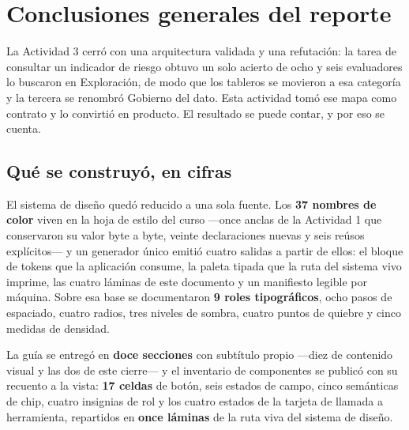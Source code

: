 %
%

\section{Conclusiones generales del reporte}

La Actividad 3 cerró con una arquitectura validada y una refutación: la tarea de consultar un indicador de riesgo obtuvo un solo acierto de ocho y seis evaluadores lo buscaron en Exploración, de modo que los tableros se movieron a esa categoría y la tercera se renombró Gobierno del dato. Esta actividad tomó ese mapa como contrato y lo convirtió en producto. El resultado se puede contar, y por eso se cuenta.

\subsection{Qué se construyó, en cifras}

El sistema de diseño quedó reducido a una sola fuente. Los \textbf{37 nombres de color} viven en la hoja de estilo del curso ---once anclas de la Actividad 1 que conservaron su valor byte a byte, veinte declaraciones nuevas y seis reúsos explícitos--- y un generador único emitió cuatro salidas a partir de ellos: el bloque de tokens que la aplicación consume, la paleta tipada que la ruta del sistema vivo imprime, las cuatro láminas de este documento y un manifiesto legible por máquina. Sobre esa base se documentaron \textbf{9 roles tipográficos}, ocho pasos de espaciado, cuatro radios, tres niveles de sombra, cuatro puntos de quiebre y cinco medidas de densidad.

La guía se entregó en \textbf{doce secciones} con subtítulo propio ---diez de contenido visual y las dos de este cierre--- y el inventario de componentes se publicó con su recuento a la vista: \textbf{17 celdas} de botón, seis estados de campo, cinco semánticas de chip, cuatro insignias de rol y los cuatro estados de la tarjeta de llamada a herramienta, repartidos en \textbf{once láminas} de la ruta viva del sistema de diseño.

